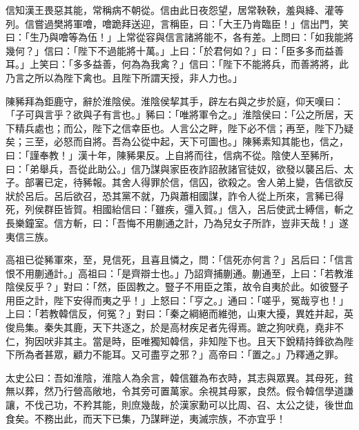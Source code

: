 \begin{pinyinscope}
信知漢王畏惡其能，常稱病不朝從。信由此日夜怨望，居常鞅鞅，羞與絳、灌等列。信嘗過樊將軍噲，噲跪拜送迎，言稱臣，曰：「大王乃肯臨臣！」信出門，笑曰：「生乃與噲等為伍！」上常從容與信言諸將能不，各有差。上問曰：「如我能將幾何？」信曰：「陛下不過能將十萬。」上曰：「於君何如？」曰：「臣多多而益善耳。」上笑曰：「多多益善，何為為我禽？」信曰：「陛下不能將兵，而善將將，此乃言之所以為陛下禽也。且陛下所謂天授，非人力也。」

陳豨拜為鉅鹿守，辭於淮陰侯。淮陰侯挈其手，辟左右與之步於庭，仰天嘆曰：「子可與言乎？欲與子有言也。」豨曰：「唯將軍令之。」淮陰侯曰：「公之所居，天下精兵處也；而公，陛下之信幸臣也。人言公之畔，陛下必不信；再至，陛下乃疑矣；三至，必怒而自將。吾為公從中起，天下可圖也。」陳豨素知其能也，信之，曰：「謹奉教！」漢十年，陳豨果反。上自將而往，信病不從。陰使人至豨所，曰：「弟舉兵，吾從此助公。」信乃謀與家臣夜詐詔赦諸官徒奴，欲發以襲呂后、太子。部署已定，待豨報。其舍人得罪於信，信囚，欲殺之。舍人弟上變，告信欲反狀於呂后。呂后欲召，恐其黨不就，乃與蕭相國謀，詐令人從上所來，言豨已得死，列侯群臣皆賀。相國紿信曰：「雖疾，彊入賀。」信入，呂后使武士縛信，斬之長樂鐘室。信方斬，曰：「吾悔不用蒯通之計，乃為兒女子所詐，豈非天哉！」遂夷信三族。

高祖已從豨軍來，至，見信死，且喜且憐之，問：「信死亦何言？」呂后曰：「信言恨不用蒯通計。」高祖曰：「是齊辯士也。」乃詔齊捕蒯通。蒯通至，上曰：「若教淮陰侯反乎？」對曰：「然，臣固教之。豎子不用臣之策，故令自夷於此。如彼豎子用臣之計，陛下安得而夷之乎！」上怒曰：「亨之。」通曰：「嗟乎，冤哉亨也！」上曰：「若教韓信反，何冤？」對曰：「秦之綱絕而維弛，山東大擾，異姓并起，英俊烏集。秦失其鹿，天下共逐之，於是高材疾足者先得焉。蹠之狗吠堯，堯非不仁，狗因吠非其主。當是時，臣唯獨知韓信，非知陛下也。且天下銳精持鋒欲為陛下所為者甚眾，顧力不能耳。又可盡亨之邪？」高帝曰：「置之。」乃釋通之罪。

太史公曰：吾如淮陰，淮陰人為余言，韓信雖為布衣時，其志與眾異。其母死，貧無以葬，然乃行營高敞地，令其旁可置萬家。余視其母冢，良然。假令韓信學道謙讓，不伐己功，不矜其能，則庶幾哉，於漢家勳可以比周、召、太公之徒，後世血食矣。不務出此，而天下已集，乃謀畔逆，夷滅宗族，不亦宜乎！


\end{pinyinscope}